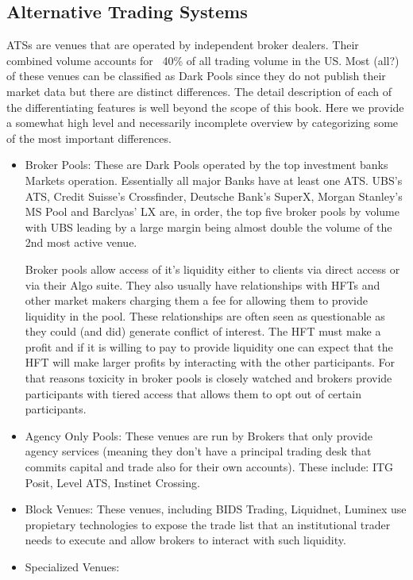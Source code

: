 \subsection{Alternative Trading Systems}
ATSs are venues that are operated by independent broker dealers. Their combined volume accounts for ~40\% of all trading volume in the US. Most (all?) of these venues can be  classified as Dark Pools since they do not publish their market data but there are distinct differences. The detail description of each of the differentiating features is well beyond the scope of this book. Here we provide a somewhat high level and necessarily incomplete overview by categorizing some of the most important differences.

\begin{itemize}
\item Broker Pools: These are Dark Pools operated by the top investment banks Markets operation. Essentially all major Banks have at least one ATS. UBS's ATS, Credit Suisse's Crossfinder, Deutsche Bank's SuperX, Morgan Stanley's MS Pool and Barclyas' LX are, in order,  the top five broker pools by volume with UBS leading by a large margin being almost double the volume of the 2nd most active venue. 

Broker pools allow access of it's liquidity either to clients via direct access or via their Algo suite. They also usually have relationships with HFTs and other market makers charging them a fee for allowing them to provide liquidity in the pool. These relationships are often seen as questionable as they could (and did) generate  conflict of interest. The HFT must make a profit and if it is willing to pay to provide liquidity one can expect that the HFT will make larger profits by interacting with the other participants. For that reasons toxicity in broker pools is closely watched and brokers provide participants with tiered access that allows them to opt out of certain participants.
\item Agency Only Pools: These venues are run by Brokers that only provide agency services (meaning they don't have a principal trading desk that commits capital and trade also for their own accounts). These include: ITG Posit, Level ATS, Instinet Crossing.
\item Block Venues: These venues, including BIDS Trading, Liquidnet, Luminex use propietary technologies to expose the trade list that an institutional trader needs to execute and allow brokers to interact with such liquidity. 
\item Specialized Venues: 
\end{itemize}

